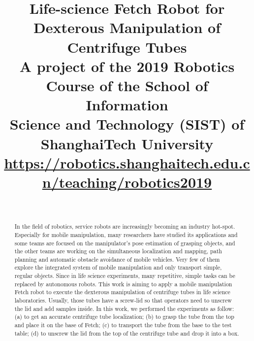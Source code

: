 \documentclass[12pt,draftclsnofoot,onecolumn]{IEEEtran}
\begin{document}
\title{%
  Life-science Fetch Robot for Dexterous Manipulation of Centrifuge Tubes \\
  \large A project of the 2019 Robotics Course of the School of Information \\Science and
Technology (SIST) of ShanghaiTech University \\
\url{https://robotics.shanghaitech.edu.cn/teaching/robotics2019}}

	
	\author{\\
	}%
	
	\maketitle
	\pagestyle{empty}  %
	\thispagestyle{empty} %
	\begin{abstract}
		In the field of robotics, service robots are increasingly becoming an industry hot-spot. Especially for mobile manipulation, many researchers have studied its applications and some teams are focused on the manipulator's pose estimation of grasping objects, and the other teams are working on the simultaneous localization and mapping, path planning and automatic obstacle avoidance of mobile vehicles. Very few of them explore the integrated system of mobile manipulation and only transport simple, regular objects.  Since in life science experiments, many repetitive, simple tasks can be replaced by autonomous robots. This work is aiming to apply a mobile manipulation Fetch robot to execute the dexterous manipulation of centrifuge tubes in life science laboratories. Usually, those tubes have a screw-lid so that operators need to unscrew the lid and add samples inside. In this work, we performed the experiments as follow: (a) to get an accurate centrifuge tube localization; (b) to grasp the tube from the top and place it on the base of Fetch; (c) to transport the tube from the base to the test table; (d) to unscrew the lid from the top of the centrifuge tube and drop it into a box. 
	\end{abstract}
	
\end{document}
